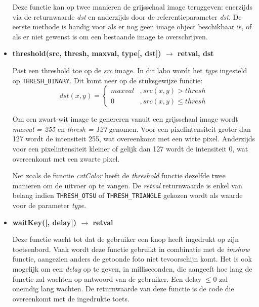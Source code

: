 \documentclass{article}
\begin{document}
\begin{itemize}
		Deze functie kan op twee manieren de grijsschaal image teruggeven: enerzijds via de returnwaarde \textit{dst} en anderzijds door de referentieparameter \textit{dst}. De eerste methode is handig voor als er nog geen image object beschikbaar is, of als er niet gewenst is om een bestaande image te overschrijven.
		
		\item \textbf{threshold(src, thresh, maxval, type[, dst]) $\rightarrow$ retval, dst}
		
		Past een threshold toe op de \textit{src} image. In dit labo wordt het \textit{type} ingesteld op \texttt{THRESH\_BINARY}. Dit komt neer op de stuksgewijze functie:
		\begin{equation*}
			dst(x, y) = \begin{cases}
			maxval &, src(x, y) > thresh\\
			0 &, src(x, y) \leq thresh
			\end{cases}
		\end{equation*}

		Om een zwart-wit image te genereren vanuit een grijsschaal image wordt \textit{maxval = 255} en \textit{thresh = 127} genomen. Voor een pixelintensiteit groter dan 127 wordt de intensiteit 255, wat overeenkomt met een witte pixel. Anderzijds voor een pixelintensiteit kleiner of gelijk dan 127 wordt de intensiteit 0, wat overeenkomt met een zwarte pixel. 
		
		Net zoals de functie \textit{cvtColor} heeft de \textit{threshold} functie dezelfde twee manieren om de uitvoer op te vangen. De \textit{retval} returnwaarde is enkel van belang indien \texttt{THRESH\_OTSU} of \texttt{THRESH\_TRIANGLE} gekozen wordt als waarde voor de parameter \textit{type}.
		
		\item \textbf{waitKey([, delay]) $\rightarrow$ retval}
		
		Deze functie wacht tot dat de gebruiker een knop heeft ingedrukt op zijn toetsenbord. Vaak wordt deze functie gebruikt in combinatie met de \textit{imshow} functie, aangezien anders de getoonde foto niet tevoorschijn komt. Het is ook mogelijk om een \textit{delay} op te geven, in milliseconden, die aangeeft hoe lang de functie zal wachten op antwoord van de gebruiker. Een delay $\leq 0$ zal oneindig lang wachten. De returnwaarde van deze functie is de code die overeenkomt met de ingedrukte toets.
		
		
	\end{itemize}
\end{document}
